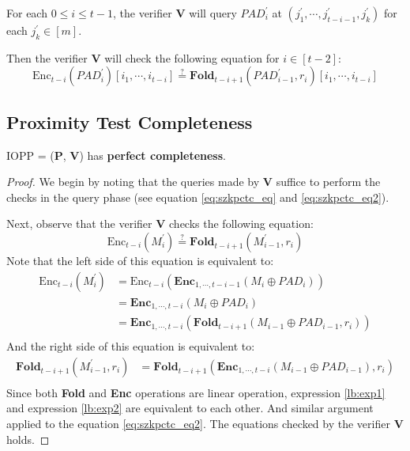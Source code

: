 \begin{enumerate}
    For each $0 \le i \le t-1$, 
    the verifier $\textbf{V}$ will query $PAD_{i}^{\prime}$ at $(j_1^\prime, \cdots, j_{t-i-1}^\prime, j_k^\prime)$ for each $j_k^\prime \in [m]$. 
    
    Then the verifier $\textbf{V}$ will check the following equation for $i \in [t-2]$:
\begin{equation}
\label{eq:szkpctc_eq2}
    \text{Enc}_{t-i}(PAD_i^\prime)[i_1, \cdots, i_{t-i}] \stackrel{?}{=} \textbf{Fold}_{t-i+1}(PAD_{i-1}^\prime, r_i) [i_1, \cdots, i_{t-i}]
\end{equation}




\end{enumerate}

\subsection{Proximity Test Completeness}

\begin{lemma}
\label{lemma:szkpctcc}

IOPP = ($\textbf{P}$, $\textbf{V}$) has \textbf{perfect completeness}.

\end{lemma}
\begin{proof}
We begin by noting that the queries made by $\textbf{V}$ suffice to perform the checks in the query phase (see equation \ref{eq:szkpctc_eq} and \ref{eq:szkpctc_eq2}).

Next, observe that the verifier $\textbf{V}$ checks the following equation:
$$
    \text{Enc}_{t-i}(M_i^\prime) \stackrel{?}{=} 
    \textbf{Fold}_{t-i+1}(M_{i-1}^\prime, r_i) 
$$
Note that the left side of this equation is equivalent to:
\begin{align}
\text{Enc}_{t-i}(M_i^\prime) \nonumber
&= \text{Enc}_{t-i}(\textbf{Enc}_{1, \cdots, t- i - 1}(M_i \oplus PAD_i)) \nonumber \\
&= \textbf{Enc}_{1, \cdots, t-i}(M_i \oplus PAD_i) \nonumber \\
&= \textbf{Enc}_{1, \cdots, t-i}(\textbf{Fold}_{t-i+1}(M_{i-1} \oplus PAD_{i-1}, r_i)) \label{lb:exp1} \\
\end{align}
And the right side of this equation is equivalent to:
\begin{align}
\textbf{Fold}_{t-i+1}(M_{i-1}^\prime, r_i) 
&= \textbf{Fold}_{t-i+1}(\textbf{Enc}_{1, \cdots, t- i}(M_{i-1} \oplus PAD_{i-1}), r_i) \label{lb:exp2} \\
\end{align}
Since both \textbf{Fold} and \textbf{Enc} operations are linear operation, expression \ref{lb:exp1} and  expression \ref{lb:exp2} are equivalent to each other. And similar argument applied to the equation \ref{eq:szkpctc_eq2}.
The equations checked by the verifier $\textbf{V}$ holds.

\end{proof}




